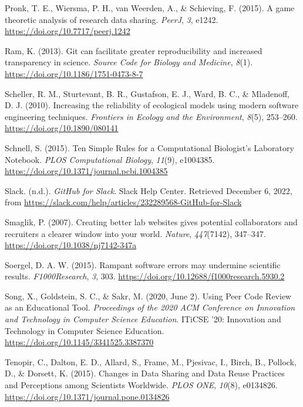 \begin{CSLReferences}{1}{0}
\leavevmode{}%
Pronk, T. E., Wiersma, P. H., van Weerden, A., \& Schieving, F. (2015). A game theoretic analysis of research data sharing. \emph{PeerJ}, \emph{3}, e1242. \url{https://doi.org/10.7717/peerj.1242}

\leavevmode{}%
Ram, K. (2013). Git can facilitate greater reproducibility and increased transparency in science. \emph{Source Code for Biology and Medicine}, \emph{8}(1). \url{https://doi.org/10.1186/1751-0473-8-7}

\leavevmode{}%
Scheller, R. M., Sturtevant, B. R., Gustafson, E. J., Ward, B. C., \& Mladenoff, D. J. (2010). Increasing the reliability of ecological models using modern software engineering techniques. \emph{Frontiers in Ecology and the Environment}, \emph{8}(5), 253--260. \url{https://doi.org/10.1890/080141}

\leavevmode{}%
Schnell, S. (2015). Ten Simple Rules for a Computational Biologist's Laboratory Notebook. \emph{PLOS Computational Biology}, \emph{11}(9), e1004385. \url{https://doi.org/10.1371/journal.pcbi.1004385}

\leavevmode{}%
Slack. (n.d.). \emph{GitHub for Slack}. Slack Help Center. Retrieved December 6, 2022, from \url{https://slack.com/help/articles/232289568-GitHub-for-Slack}

\leavevmode{}%
Smaglik, P. (2007). Creating better lab websites gives potential collaborators and recruiters a clearer window into your world. \emph{Nature}, \emph{447}(7142), 347--347. \url{https://doi.org/10.1038/nj7142-347a}

\leavevmode{}%
Soergel, D. A. W. (2015). Rampant software errors may undermine scientific results. \emph{F1000Research}, \emph{3}, 303. \url{https://doi.org/10.12688/f1000research.5930.2}

\leavevmode{}%
Song, X., Goldstein, S. C., \& Sakr, M. (2020, June 2). Using Peer Code Review as an Educational Tool. \emph{Proceedings of the 2020 ACM Conference on Innovation and Technology in Computer Science Education}. ITiCSE '20: Innovation and Technology in Computer Science Education. \url{https://doi.org/10.1145/3341525.3387370}

\leavevmode{}%
Tenopir, C., Dalton, E. D., Allard, S., Frame, M., Pjesivac, I., Birch, B., Pollock, D., \& Dorsett, K. (2015). Changes in Data Sharing and Data Reuse Practices and Perceptions among Scientists Worldwide. \emph{PLOS ONE}, \emph{10}(8), e0134826. \url{https://doi.org/10.1371/journal.pone.0134826}


\end{CSLReferences}
